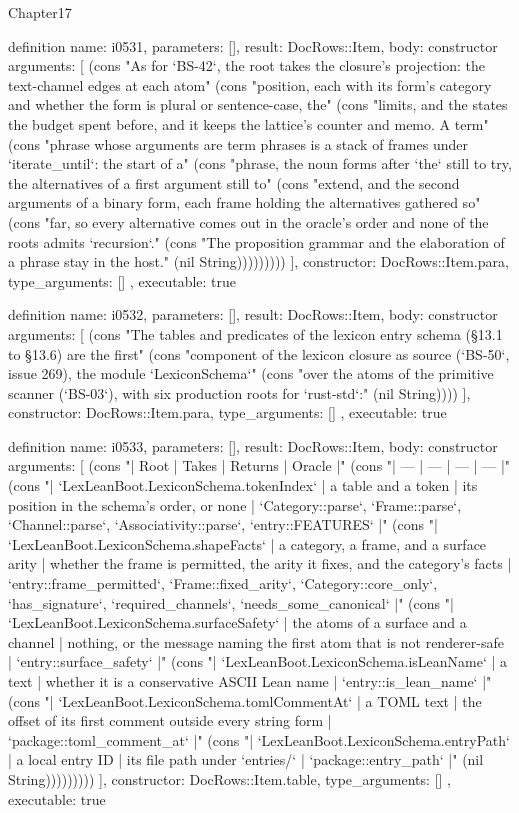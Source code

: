 \begin{lexlean}{Chapter17}
\begin{semanticmodule}
definition{
  name: i0531,
  parameters: [],
  result: DocRows::Item,
  body: constructor{
    arguments: [
      (cons "As for `BS-42`, the root takes the closure's projection: the text-channel edges at each atom" (cons "position, each with its form's category and whether the form is plural or sentence-case, the" (cons "limits, and the states the budget spent before, and it keeps the lattice's counter and memo. A term" (cons "phrase whose arguments are term phrases is a stack of frames under `iterate_until`: the start of a" (cons "phrase, the noun forms after `the` still to try, the alternatives of a first argument still to" (cons "extend, and the second arguments of a binary form, each frame holding the alternatives gathered so" (cons "far, so every alternative comes out in the oracle's order and none of the roots admits `recursion`." (cons "The proposition grammar and the elaboration of a phrase stay in the host." (nil String)))))))))
    ],
    constructor: DocRows::Item.para,
    type_arguments: []
  },
  executable: true
}

definition{
  name: i0532,
  parameters: [],
  result: DocRows::Item,
  body: constructor{
    arguments: [
      (cons "The tables and predicates of the lexicon entry schema (§13.1 to §13.6) are the first" (cons "component of the lexicon closure as source (`BS-50`, issue 269), the module `LexiconSchema`" (cons "over the atoms of the primitive scanner (`BS-03`), with six production roots for `rust-std`:" (nil String))))
    ],
    constructor: DocRows::Item.para,
    type_arguments: []
  },
  executable: true
}

definition{
  name: i0533,
  parameters: [],
  result: DocRows::Item,
  body: constructor{
    arguments: [
      (cons "| Root | Takes | Returns | Oracle |" (cons "| --- | --- | --- | --- |" (cons "| `LexLeanBoot.LexiconSchema.tokenIndex` | a table and a token | its position in the schema's order, or none | `Category::parse`, `Frame::parse`, `Channel::parse`, `Associativity::parse`, `entry::FEATURES` |" (cons "| `LexLeanBoot.LexiconSchema.shapeFacts` | a category, a frame, and a surface arity | whether the frame is permitted, the arity it fixes, and the category's facts | `entry::frame_permitted`, `Frame::fixed_arity`, `Category::core_only`, `has_signature`, `required_channels`, `needs_some_canonical` |" (cons "| `LexLeanBoot.LexiconSchema.surfaceSafety` | the atoms of a surface and a channel | nothing, or the message naming the first atom that is not renderer-safe | `entry::surface_safety` |" (cons "| `LexLeanBoot.LexiconSchema.isLeanName` | a text | whether it is a conservative ASCII Lean name | `entry::is_lean_name` |" (cons "| `LexLeanBoot.LexiconSchema.tomlCommentAt` | a TOML text | the offset of its first comment outside every string form | `package::toml_comment_at` |" (cons "| `LexLeanBoot.LexiconSchema.entryPath` | a local entry ID | its file path under `entries/` | `package::entry_path` |" (nil String)))))))))
    ],
    constructor: DocRows::Item.table,
    type_arguments: []
  },
  executable: true
}


\end{semanticmodule}
\end{lexlean}
